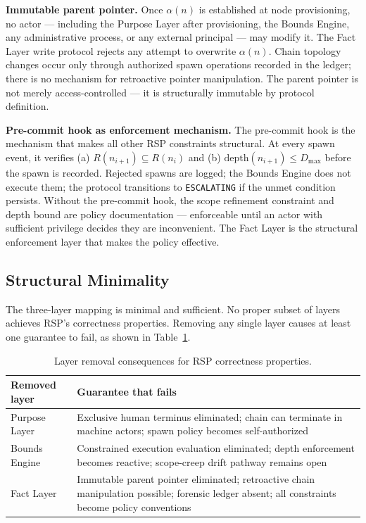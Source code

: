 \medskip
\noindent\textbf{Immutable parent pointer.} Once $\alpha(n)$ is established at node provisioning, no actor — including the Purpose Layer after provisioning, the Bounds Engine, any administrative process, or any external principal — may modify it. The Fact Layer write protocol rejects any attempt to overwrite $\alpha(n)$. Chain topology changes occur only through authorized spawn operations recorded in the ledger; there is no mechanism for retroactive pointer manipulation. The parent pointer is not merely access-controlled — it is structurally immutable by protocol definition.

\medskip
\noindent\textbf{Pre-commit hook as enforcement mechanism.} The pre-commit hook is the mechanism that makes all other RSP constraints structural. At every spawn event, it verifies (a) $R(n_{i+1}) \subseteq R(n_i)$ and (b) $\mathrm{depth}(n_{i+1}) \leq D_{\mathrm{max}}$ before the spawn is recorded. Rejected spawns are logged; the Bounds Engine does not execute them; the protocol transitions to \texttt{ESCALATING} if the unmet condition persists. Without the pre-commit hook, the scope refinement constraint and depth bound are policy documentation — enforceable until an actor with sufficient privilege decides they are inconvenient. The Fact Layer is the structural enforcement layer that makes the policy effective.

\subsection{Structural Minimality}
\label{sec:rs-minimality}

The three-layer mapping is minimal and sufficient. No proper subset of layers achieves RSP's correctness properties. Removing any single layer causes at least one guarantee to fail, as shown in Table~\ref{tab:layer-minimality}.

\begin{table}[h]
\centering
\begin{tabular}{p{3.2cm} p{4.8cm}}
\toprule
\textbf{Removed layer} & \textbf{Guarantee that fails} \\
\midrule
Purpose Layer & Exclusive human terminus eliminated; chain can terminate in machine actors; spawn policy becomes self-authorized \\
Bounds Engine & Constrained execution evaluation eliminated; depth enforcement becomes reactive; scope-creep drift pathway remains open \\
Fact Layer & Immutable parent pointer eliminated; retroactive chain manipulation possible; forensic ledger absent; all constraints become policy conventions \\
\bottomrule
\end{tabular}
\caption{Layer removal consequences for RSP correctness properties.}
\label{tab:layer-minimality}
\end{table}


